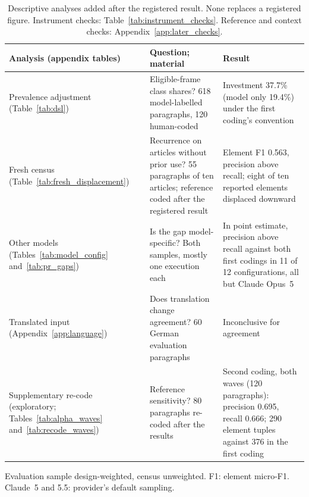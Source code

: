 \begin{table}[!tbp]
\centering
\scriptsize
\setlength{\tabcolsep}{3pt}
\renewcommand{\arraystretch}{1.1}
\begin{threeparttable}
\caption[Analyses added after the registered result]{Descriptive analyses added after the registered result. None replaces a registered figure. Instrument checks: Table~\ref{tab:instrument_checks}. Reference and context checks: Appendix~\ref{app:later_checks}.}
\label{tab:added_analyses}
\begin{tabular}{@{}>{\raggedright\arraybackslash}p{36mm}>{\raggedright\arraybackslash}p{50mm}>{\raggedright\arraybackslash}p{65mm}@{}}
\toprule
\textbf{Analysis (appendix tables)} & \textbf{Question; material} & \textbf{Result} \\
\midrule
Prevalence adjustment (Table~\ref{tab:dsl}) & Eligible-frame class shares? 618 model-labelled paragraphs, 120 human-coded & Investment 37.7\% (model only 19.4\%) under the first coding's convention \\
\addlinespace
Fresh census (Table~\ref{tab:fresh_displacement}) & Recurrence on articles without prior use? 55 paragraphs of ten articles; reference coded after the registered result & Element F1 0.563, precision above recall; eight of ten reported elements displaced downward \\
\addlinespace
Other models (Tables~\ref{tab:model_config} and~\ref{tab:pr_gaps}) & Is the gap model-specific? Both samples, mostly one execution each & In point estimate, precision above recall against both first codings in 11 of 12 configurations, all but Claude Opus~5 \\
\addlinespace
Translated input (Appendix~\ref{app:language}) & Does translation change agreement? 60 German evaluation paragraphs & Inconclusive for agreement \\
\addlinespace
Supplementary re-code (exploratory; Tables~\ref{tab:alpha_waves} and~\ref{tab:recode_waves}) & Reference sensitivity? 80 paragraphs re-coded after the results & Second coding, both waves (120 paragraphs): precision 0.695, recall 0.666; 290 element tuples against 376 in the first coding \\
\bottomrule
\end{tabular}
\begin{tablenotes}\footnotesize
\item Evaluation sample design-weighted, census unweighted. F1: element micro-F1. Claude~5 and 5.5: provider's default sampling.
\end{tablenotes}
\end{threeparttable}
\end{table}
